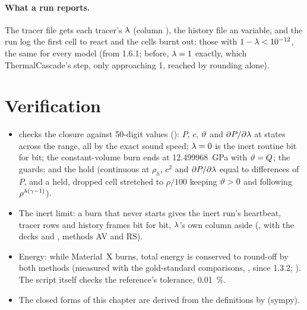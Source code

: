\paragraph{What a run reports.} The tracer file gets each tracer's $\lambda$
(column ), the history file an  variable, and the run log
the first cell to react and the cells burnt out: those with $1 - \lambda <
10^{-12}$, the same for every model (from 1.6.1; before, $\lambda = 1$ exactly,
which ThermalCascade's step, only approaching 1, reached by rounding alone).

\section{Verification}
\label{sec:burning-cell-verification}

\begin{itemize}
\item {} checks the closure against 50-digit values
  (): $P$, $c$, $\vartheta$ and $\partial
  P/\partial\lambda$ at states across the range, all by the exact sound speed;
  $\lambda = 0$ is the inert routine bit for bit; the constant-volume burn ends
  at 12.499968~GPa with $\vartheta = Q$; the guards; and the hold (continuous at
  $\rho_h$, $c^2$ and $\partial P/\partial\lambda$ equal to differences of $P$,
  and a held, dropped cell stretched to $\rho/100$ keeping $\vartheta > 0$ and
  following $\rho^{\lambda(\gamma-1)}$).
\item The inert limit: a burn that never starts gives the inert run's
  heartbeat, tracer rows and history frames bit for bit, $\lambda$'s own column
  aside (, with the decks
   and , methods AV and RS).
\item Energy: while Material~X burns, total energy is conserved to
  round-off by both methods (measured with the gold-standard comparisons,
  , since 1.3.2;
  ). The script itself checks the
  reference's tolerance, 0.01~\%.
\item The closed forms of this chapter are derived from the definitions by
   (sympy).
\end{itemize}
